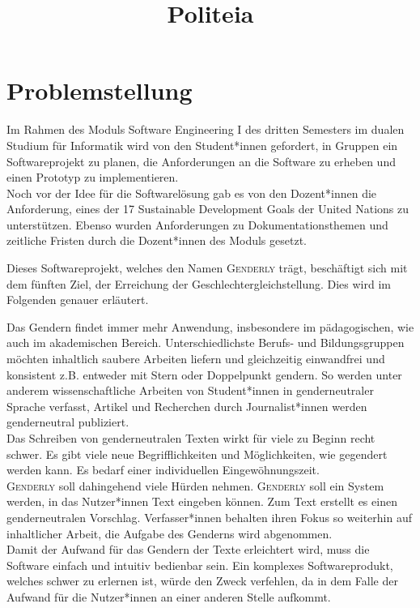 \documentclass[paper=a4, parskip=half]{scrreprt}
\newcommand{\Genderly}{\textsc{Genderly }}
\begin{document}
\title{Politeia} %







\chapter{Problemstellung} \label{Problemstellung}
Im Rahmen des Moduls Software Engineering I des dritten Semesters im dualen Studium für Informatik wird von den Student*innen gefordert, in Gruppen ein Softwareprojekt zu planen, die Anforderungen an die Software zu erheben und einen Prototyp zu implementieren. \\
Noch vor der Idee für die Softwarelösung gab es von den Dozent*innen die Anforderung, eines der 17 Sustainable Development Goals der United Nations \cite{UNGoals} zu unterstützen. Ebenso wurden Anforderungen zu Dokumentationsthemen und zeitliche Fristen durch die Dozent*innen des Moduls gesetzt.

Dieses Softwareprojekt, welches den Namen \Genderly trägt, beschäftigt sich mit dem fünften Ziel, der Erreichung der Geschlechtergleichstellung. Dies wird im Folgenden genauer erläutert.

Das Gendern findet immer mehr Anwendung, insbesondere im pädagogischen, wie auch im akademischen Bereich. Unterschiedlichste Berufs- und Bildungsgruppen möchten inhaltlich saubere Arbeiten liefern und gleichzeitig einwandfrei und konsistent z.B. entweder mit Stern oder Doppelpunkt gendern. So werden unter anderem wissenschaftliche Arbeiten von Student*innen in genderneutraler Sprache verfasst, Artikel und Recherchen durch Journalist*innen werden genderneutral publiziert. \\
Das Schreiben von genderneutralen Texten wirkt für viele zu Beginn recht schwer. Es gibt viele neue Begrifflichkeiten und Möglichkeiten, wie gegendert werden kann. Es bedarf einer individuellen Eingewöhnungszeit. \\
\Genderly soll dahingehend viele Hürden nehmen. \Genderly soll ein System werden, in das Nutzer*innen Text eingeben können. Zum Text erstellt es einen genderneutralen Vorschlag. Verfasser*innen behalten ihren Fokus so weiterhin auf inhaltlicher Arbeit, die Aufgabe des Genderns wird abgenommen. \\
Damit der Aufwand für das Gendern der Texte erleichtert wird, muss die Software einfach und intuitiv bedienbar sein. Ein komplexes Softwareprodukt, welches schwer zu erlernen ist, würde den Zweck verfehlen, da in dem Falle der Aufwand für die Nutzer*innen an einer anderen Stelle aufkommt.
\end{document}
